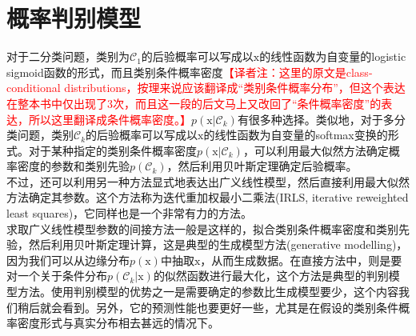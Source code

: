 \documentclass[b5paper]{book}
\numberwithin{equation}{chapter}
\newcommand {\bx} {\boldsymbol{\mathrm{x}}}
\newcommand {\calC} {\mathcal{C}}
\newcommand {\insertline} {\noindent{\color{red} \rule[5pt]{\textwidth}{0.1em}}}
\begin{document}
	\section{概率判别模型}
	\insertline
	\textnormal{
	\indent 对于二分类问题，类别为$\calC_1$的后验概率可以写成以$\bx$的线性函数为自变量的logistic sigmoid函数的形式，而且类别条件概率密度\textcolor{red}{【译者注：这里的原文是class-conditional distributions，按理来说应该翻译成“类别条件概率分布”，但这个表达在整本书中仅出现了3次，而且这一段的后文马上又改回了“条件概率密度”的表达，所以这里翻译成条件概率密度。】}$p(\bx|\calC_k)$有很多种选择。类似地，对于多分类问题，类别$\calC_k$的后验概率可以写成以$\bx$的线性函数为自变量的softmax变换的形式。对于某种指定的类别条件概率密度$p(\bx|\calC_k)$，可以利用最大似然方法确定概率密度的参数和类别先验$p(\calC_k)$，然后利用贝叶斯定理确定后验概率。\\
	\indent 不过，还可以利用另一种方法显式地表达出广义线性模型，然后直接利用最大似然方法确定其参数。这个方法称为迭代重加权最小二乘法(IRLS, iterative reweighted least squares)，它同样也是一个非常有力的方法。\\
	\indent 求取广义线性模型参数的间接方法一般是这样的，拟合类别条件概率密度和类别先验，然后利用贝叶斯定理计算，这是典型的生成模型方法(generative modelling)，因为我们可以从边缘分布$p(\bx)$中抽取$\bx$，从而生成数据。在直接方法中，则是要对一个关于条件分布$p(\calC_k|\bx)$的似然函数进行最大化，这个方法是典型的判别模型方法。使用判别模型的优势之一是需要确定的参数比生成模型要少，这个内容我们稍后就会看到。另外，它的预测性能也要更好一些，尤其是在假设的类别条件概率密度形式与真实分布相去甚远的情况下。
	}
\end{document}
